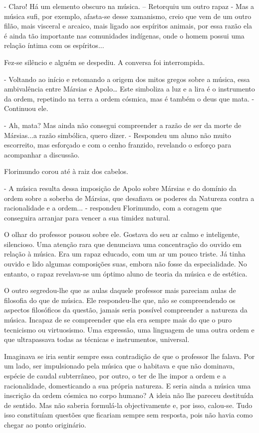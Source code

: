 - Claro! Há um elemento obscuro na música. -- Retorquiu um outro rapaz -
Mas a música sufi, por exemplo, afasta-se desse xamanismo, creio que vem
de um outro filão, mais visceral e arcaico, mais ligado aos espíritos
animais, por essa razão ela é ainda tão importante nas comunidades
indígenas, onde o homem possui uma relação íntima com os espíritos...

Fez-se silêncio e alguém se despediu. A conversa foi interrompida.

- Voltando ao início e retomando a origem dos mitos gregos sobre a
música, essa ambivalência entre Mársias e Apolo\ldots{} Este simboliza a
luz e a lira é o instrumento da ordem, repetindo na terra a ordem
cósmica, mas é também o deus que mata. - Continuou ele.

- Ah, mata? Mas ainda não consegui compreender a razão de ser da morte
de Mársias...a razão simbólica, quero dizer. - Respondeu um aluno não
muito escorreito, mas esforçado e com o cenho franzido, revelando o
esforço para acompanhar a discussão.

Florimundo corou até à raiz dos cabelos.

- A música resulta dessa imposição de Apolo sobre Mársias e do domínio
da ordem sobre a soberba de Mársias, que desafiava os poderes da
Natureza contra a racionalidade e a ordem... - respondeu Florimundo, com
a coragem que conseguira arranjar para vencer a sua timidez natural.

O olhar do professor pousou sobre ele. Gostava do seu ar calmo e
inteligente, silencioso. Uma atenção rara que denunciava uma
concentração do ouvido em relação à música. Era um rapaz educado, com um
ar um pouco triste. Já tinha ouvido e lido algumas composições suas,
embora não fosse da especialidade. No entanto, o rapaz revelava-se um
óptimo aluno de teoria da música e de estética.

O outro segredou-lhe que as aulas daquele professor mais pareciam aulas
de filosofia do que de música. Ele respondeu-lhe que, não se
compreendendo os aspectos filosóficos da questão, jamais seria possível
compreender a natureza da música. Incapaz de se compreender que ela era
sempre mais do que o puro tecnicismo ou virtuosismo. Uma expressão, uma
linguagem de uma outra ordem e que ultrapassava todas as técnicas e
instrumentos, universal.

Imaginava se iria sentir sempre essa contradição de que o professor lhe
falava. Por um lado, ser impulsionado pela música que o habitava e que
não dominava, espécie de caudal subterrâneo, por outro, o ter de lhe
impor a ordem e a racionalidade, domesticando a sua própria natureza. E
seria ainda a música uma inscrição da ordem cósmica no corpo humano? A
ideia não lhe pareceu destituída de sentido. Mas não saberia formulá-la
objectivamente e, por isso, calou-se. Tudo isso constituíam questões que
ficariam sempre sem resposta, pois não havia como chegar ao ponto
originário.

